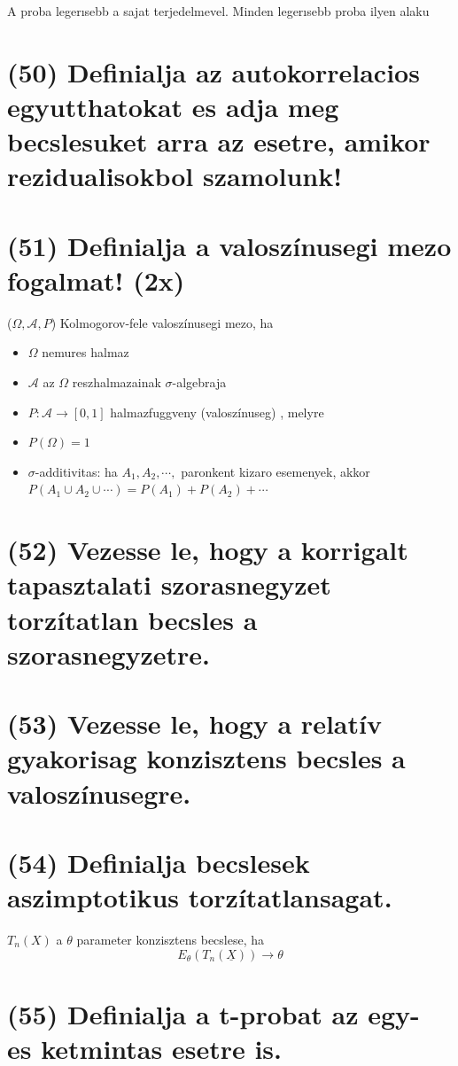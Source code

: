 \documentclass[12p]{article}
\begin{document}
A proba legerısebb a sajat terjedelmevel. Minden legerısebb proba ilyen alaku

\section{(50) Definialja az autokorrelacios egyutthatokat es adja meg becslesuket arra az esetre, amikor rezidualisokbol szamolunk!}

\section{(51) Definialja a valoszínusegi mezo fogalmat! (2x)}

($\Omega, \mathcal{A}, P$) Kolmogorov-fele
valoszínusegi mezo, ha
\begin{itemize}
	\item $\Omega$ nemures halmaz
	\item $\mathcal{A}$ az $\Omega$ reszhalmazainak $\sigma$-algebraja
	\item $P: \mathcal{A} \rightarrow [0, 1]$  halmazfuggveny
(valoszínuseg) , melyre
	\item $P(\Omega) = 1$
	\item $\sigma$-additivitas: ha $A_1, A_2,\cdots,$ paronkent
kizaro esemenyek, akkor $P(A_1 \cup A_2 \cup \cdots) = P(A_1) + P(A_2) + \cdots$
\end{itemize}

\section{(52) Vezesse le, hogy a korrigalt tapasztalati szorasnegyzet torzítatlan becsles a szorasnegyzetre. }

\section{(53) Vezesse le, hogy a relatív gyakorisag konzisztens becsles a valoszínusegre.}

\section{(54) Definialja becslesek aszimptotikus torzítatlansagat.}

$T_n(X)$ a $\theta$ parameter konzisztens becslese, ha
$$E_{\theta}(T_n(\underline{X})) \rightarrow \theta$$

\section{(55) Definialja a t-probat az egy- es ketmintas esetre is.}
\end{document}
